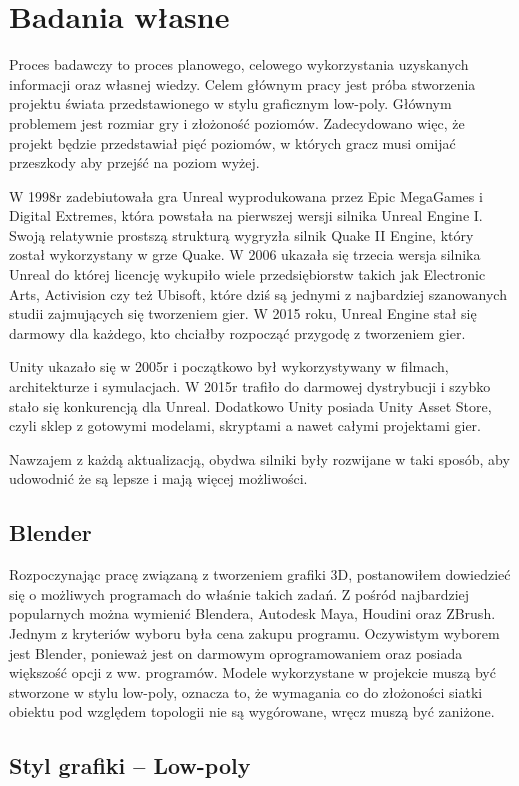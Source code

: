 \chapter{Badania własne}
\indent Proces badawczy to proces planowego, celowego wykorzystania uzyskanych informacji oraz własnej wiedzy. Celem głównym pracy jest próba stworzenia projektu świata przedstawionego w stylu graficznym low-poly. Głównym problemem jest rozmiar gry i złożoność poziomów. Zadecydowano więc, że projekt będzie przedstawiał pięć poziomów, w których gracz musi omijać przeszkody aby przejść na poziom wyżej.

\indent W 1998r zadebiutowała gra Unreal wyprodukowana przez Epic MegaGames i Digital Extremes, która powstała na pierwszej wersji silnika Unreal Engine I. Swoją relatywnie prostszą strukturą wygryzła silnik Quake II Engine, który został wykorzystany w grze Quake. W 2006 ukazała się trzecia wersja silnika Unreal do której licencję wykupiło wiele przedsiębiorstw takich jak Electronic Arts, Activision czy też Ubisoft, które dziś są jednymi z najbardziej szanowanych studii zajmujących się tworzeniem gier. W 2015 roku, Unreal Engine stał się darmowy dla każdego, kto chciałby rozpocząć przygodę z tworzeniem gier.

\indent Unity ukazało się w 2005r i początkowo był wykorzystywany w filmach, architekturze i symulacjach. W 2015r trafiło do darmowej dystrybucji i szybko stało się konkurencją dla Unreal. Dodatkowo Unity posiada Unity Asset Store, czyli sklep z gotowymi modelami, skryptami a nawet całymi projektami gier.

\indent Nawzajem z każdą aktualizacją, obydwa silniki były rozwijane w taki sposób, aby udowodnić że są lepsze i mają więcej możliwości.
\section{Blender}
\indent Rozpoczynając pracę związaną z tworzeniem grafiki 3D, postanowiłem dowiedzieć się o możliwych programach do właśnie takich zadań. Z pośród najbardziej popularnych można wymienić Blendera, Autodesk Maya, Houdini oraz ZBrush. Jednym z kryteriów wyboru była cena zakupu programu. Oczywistym wyborem jest Blender, ponieważ jest on darmowym oprogramowaniem oraz posiada większość opcji z ww. programów. Modele wykorzystane w projekcie muszą być stworzone w stylu low-poly, oznacza to, że wymagania co do złożoności siatki obiektu pod względem topologii nie są wygórowane, wręcz muszą być zaniżone. 
\section{Styl grafiki -- Low-poly}

